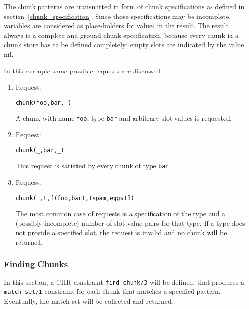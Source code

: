 The chunk patterns are transmitted in form of chunk specifications as defined in section~\ref{chunk_specification}. Since those specifications may be incomplete, variables are considered as place-holders for values in the result. The result always is a complete and ground chunk specification, because every chunk in a chunk store has to be defined completely; empty slots are indicated by the value nil.

\begin{example}
In this example some possible requests are discussed.

\begin{enumerate}
 \item Request:
\begin{lstlisting}
chunk(foo,bar,_)        
\end{lstlisting}

A chunk with name \lstinline|foo|, type \lstinline|bar| and arbitrary slot values is requested.

 \item Request:
\begin{lstlisting}
chunk(_,bar,_)        
\end{lstlisting}

This request is satisfied by every chunk of type \lstinline|bar|.

 \item Request:
\begin{lstlisting}
chunk(_,t,[(foo,bar),(spam,eggs)])        
\end{lstlisting}

The most common case of requests is a specification of the type and a (possibly incomplete) number of slot-value pairs for that type. If a type does not provide a specified slot, the request is invalid and no chunk will be returned.

\end{enumerate}

\end{example}

\subsubsection{Finding Chunks}

In this section, a CHR constraint \lstinline|find_chunk/3| will be defined, that produces a \lstinline|match_set/1| constraint for each chunk that matches a specified pattern. Eventually, the match set will be collected and returned.

